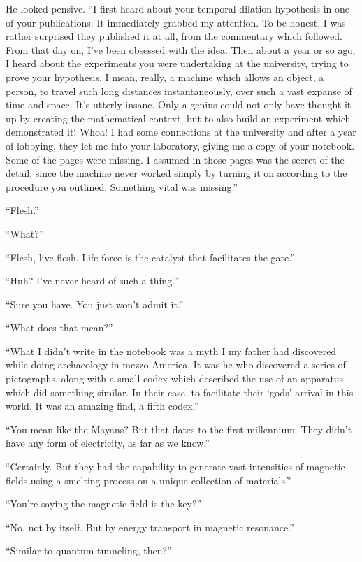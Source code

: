 \documentclass[
]{article}
\begin{document}
He looked pensive. ``I first heard about your temporal dilation
hypothesis in one of your publications. It immediately grabbed my
attention. To be honest, I was rather surprised they published it at
all, from the commentary which followed. From that day on, I've been
obsessed with the idea. Then about a year or so ago, I heard about the
experiments you were undertaking at the university, trying to prove your
hypothesis. I mean, really, a machine which allows an object, a person,
to travel such long distances instantaneously, over such a vast expanse
of time and space. It's utterly insane. Only a genius could not only
have thought it up by creating the mathematical context, but to also
build an experiment which demonstrated it! Whoa! I had some connections
at the university and after a year of lobbying, they let me into your
laboratory, giving me a copy of your notebook. Some of the pages were
missing. I assumed in those pages was the secret of the detail, since
the machine never worked simply by turning it on according to the
procedure you outlined. Something vital was missing.''

``Flesh.''

``What?''

``Flesh, live flesh. Life-force is the catalyst that facilitates the
gate.''

``Huh? I've never heard of such a thing.''

``Sure you have. You just won't admit it.''

``What does that mean?''

``What I didn't write in the notebook was a myth I my father had
discovered while doing archaeology in mezzo America. It was he who
discovered a series of pictographs, along with a small codex which
described the use of an apparatus which did something similar. In their
case, to facilitate their `gods' arrival in this world. It was an
amazing find, a fifth codex.''

``You mean like the Mayans? But that dates to the first millennium. They
didn't have any form of electricity, as far as we know.''

``Certainly. But they had the capability to generate vast intensities of
magnetic fields using a smelting process on a unique collection of
materials.''

``You're saying the magnetic field is the key?''

``No, not by itself. But by energy transport in magnetic resonance.''

``Similar to quantum tunneling, then?''
\end{document}
